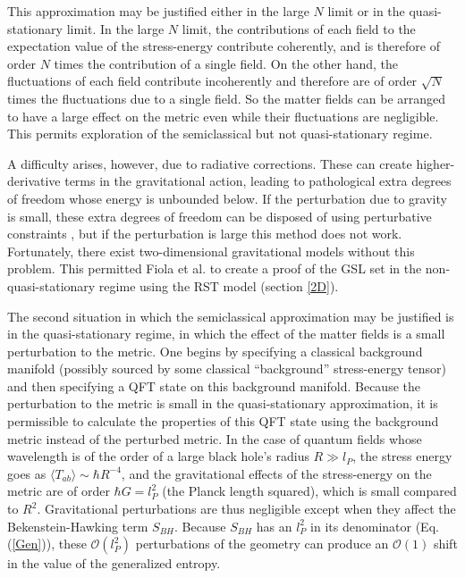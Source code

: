 \documentclass{article}
\begin{document}
This approximation may be justified either in the large $N$ limit or in the quasi-stationary limit.  In the large $N$ limit, the contributions of each field to the expectation value of the stress-energy contribute coherently, and is therefore of order $N$ times the contribution of a single field.  On the other hand, the fluctuations of each field contribute incoherently and therefore are of order $\sqrt{N}$ times the fluctuations due to a single field.  So the matter fields can be arranged to have a large effect on the metric even while their fluctuations are negligible.  This permits exploration of the semiclassical but not quasi-stationary regime.

A difficulty arises, however, due to radiative corrections.  These can create higher-derivative terms in the gravitational action, leading to pathological extra degrees of freedom whose energy is unbounded below.  If the perturbation due to gravity is small, these extra degrees of freedom can be disposed of using perturbative constraints \cite{simon90}, but if the perturbation is large this method does not work.  Fortunately, there exist two-dimensional gravitational models without this problem.  This permitted Fiola et al. \cite{fiola94} to create a proof of the GSL set in the non-quasi-stationary regime using the RST model (section \ref{2D}).

The second situation in which the semiclassical approximation may be justified is in the quasi-stationary regime, in which the effect of the matter fields is a small perturbation to the metric.  One begins by specifying a classical background manifold (possibly sourced by some classical ``background'' stress-energy tensor) and then specifying a QFT state on this background manifold.  Because the perturbation to the metric is small in the quasi-stationary approximation, it is permissible to calculate the properties of this QFT state using the background metric instead of the perturbed metric.  In the case of quantum fields whose wavelength is of the order of a large black hole's radius $R \gg l_{P}$, the stress energy goes as $\langle T_{ab} \rangle \sim \hbar R^{-4}$, and the gravitational effects of the stress-energy on the metric are of order $\hbar G = l_{P}^2$ (the Planck length squared), which is small compared to $R^2$.  Gravitational perturbations are thus negligible except when they affect the Bekenstein-Hawking term $S_{BH}$.  Because $S_{BH}$ has an $l_{P}^2$ in its denominator (Eq. (\ref{Gen})), these $\mathcal{O}(l_{P}^2)$ perturbations of the geometry can produce an $\mathcal{O}(1)$ shift in the value of the generalized entropy.
\end{document}
